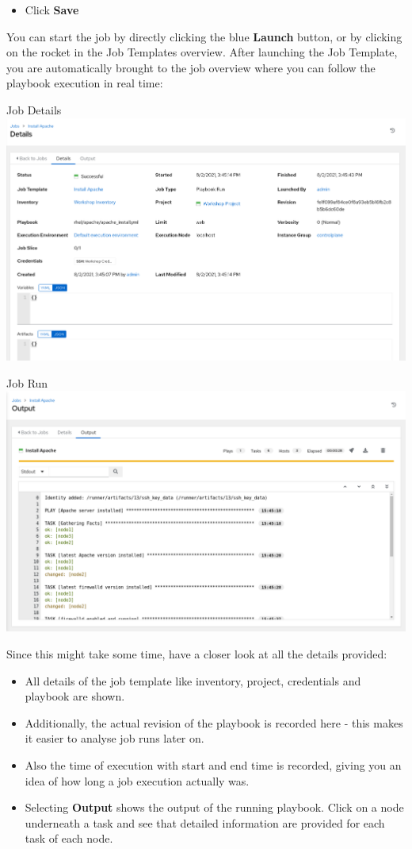 \begin{itemize}
\tightlist
\item
  Click \textbf{Save}
\end{itemize}

You can start the job by directly clicking the blue \textbf{Launch}
button, or by clicking on the rocket in the Job Templates overview.
After launching the Job Template, you are automatically brought to the
job overview where you can follow the playbook execution in real time:

Job Details \includegraphics{images/02_job_details.png}

Job Run \includegraphics{images/02_job_run.png}

Since this might take some time, have a closer look at all the details
provided:

\begin{itemize}
\item
  All details of the job template like inventory, project, credentials
  and playbook are shown.
\item
  Additionally, the actual revision of the playbook is recorded here -
  this makes it easier to analyse job runs later on.
\item
  Also the time of execution with start and end time is recorded, giving
  you an idea of how long a job execution actually was.
\item
  Selecting \textbf{Output} shows the output of the running playbook.
  Click on a node underneath a task and see that detailed information
  are provided for each task of each node.
\end{itemize}

